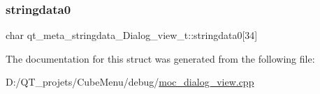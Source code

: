 \subsubsection{\texorpdfstring{stringdata0}{stringdata0}}
{\footnotesize\ttfamily char qt\+\_\+meta\+\_\+stringdata\+\_\+\+Dialog\+\_\+view\+\_\+t\+::stringdata0\mbox{[}34\mbox{]}}



The documentation for this struct was generated from the following file\+:\begin{DoxyCompactItemize}
\item 
D\+:/\+Q\+T\+\_\+projets/\+Cube\+Menu/debug/\hyperlink{moc__dialog__view_8cpp}{moc\+\_\+dialog\+\_\+view.\+cpp}\end{DoxyCompactItemize}

